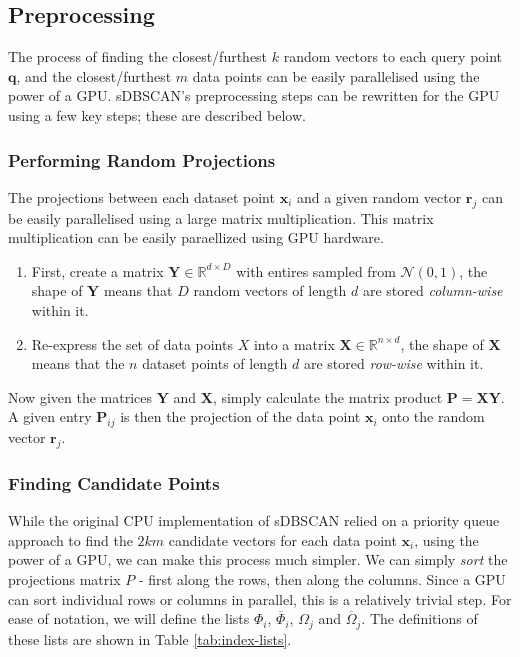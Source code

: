 \documentclass{article}
\newcommand{\br}{\mathbf{r}}
\newcommand{\brj}{\mathbf{r}_{j}}
\newcommand{\bq}{\mathbf{q}}
\newcommand{\bx}{\mathbf{x}}
\newcommand{\bxi}{\mathbf{x}_{i}}
\newcommand{\bY}{\mathbf{Y}}
\newcommand{\bX}{\mathbf{X}}
\newcommand{\bP}{\mathbf{P}}
\newcommand{\phiCi}{\Phi_i}
\newcommand{\phiFi}{\overline{\Phi}_i}
\newcommand{\omegaCj}{\Omega_j}
\newcommand{\omegaFj}{\overline{\Omega}_j}
\newcommand{\Real}{\mathbb{R}}
\newcommand{\bXIn}{\bX \in \Real^{n \times d}}
\begin{document}
\subsection{Preprocessing}
The process of finding the closest/furthest $k$ random vectors to each query point $\bq$, and the closest/furthest $m$ data points can be easily parallelised using the power of a GPU. sDBSCAN's preprocessing steps can be rewritten for the GPU using a few key steps; these are described below.

\subsubsection{Performing Random Projections}
The projections between each dataset point $\bx_i$ and a given random vector $\br_j$ can be easily parallelised using a large matrix multiplication. This matrix multiplication can be easily paraellized using GPU hardware.

\begin{enumerate}
    \item First, create a matrix $\bY \in \mathbb{R}^{d \times D}$ with entires sampled from $\mathcal{N}(0, 1)$, the shape of $\bY$ means that $D$ random vectors of length $d$ are stored \textit{column-wise} within it.
    \item Re-express the set of data points $X$ into a matrix $\bXIn$, the shape of $\bX$ means that the $n$ dataset points of length $d$ are stored \textit{row-wise} within it.
\end{enumerate}

Now given the matrices $\bY$ and $\bX$, simply calculate the matrix product $\bP=\bX\bY$. A given entry $\bP_{ij}$ is then the projection of the data point $\bxi$ onto the random vector $\brj$.

\subsubsection{Finding Candidate Points}


While the original CPU implementation of sDBSCAN relied on a priority queue approach to find the $2km$ candidate vectors for each data point $\bxi$, using the power of a GPU, we can make this process much simpler. We can simply \textit{sort} the projections matrix $P$ - first along the rows, then along the columns. Since a GPU can sort individual rows or columns in parallel, this is a relatively trivial step. For ease of notation, we will define the lists $\phiCi$, $\phiFi$, $\omegaCj$ and $\omegaFj$. The definitions of these lists are shown in Table \ref{tab:index-lists}.
\end{document}
